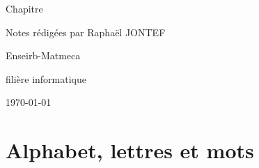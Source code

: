 \documentclass[12pt]{article}
\begin{document}



\hypersetup{pageanchor=false}
\setlength{\headheight}{15pt}
\begin{titlepage}
    \centering
    \vspace*{3cm}
    {\huge Chapitre \numeroChapitre\par}
    {\Huge \bfseries\texteNomChapitre \par} %
    \vspace{2cm}
    {\Large Notes rédigées par Raphaël JONTEF\par}
    \vspace{0.5cm}
    {\normalsize \texteNomProf \par}
    \vspace{4cm}
    {\small Enseirb-Matmeca\par}
    {\small filière informatique\par}
    \vfill
    {\large \today\par}
\end{titlepage}
\hypersetup{pageanchor=true} %

\tableofcontents
\newpage


\section{Alphabet, lettres et mots}

\section{}

\section{}


\section*{}

\end{document}
